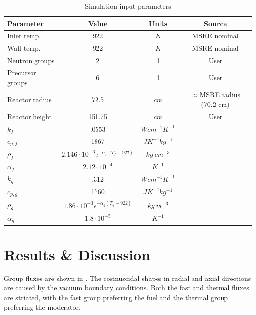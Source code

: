 \documentclass{article}
\let\Oldsection\section
\renewcommand{\section}{\FloatBarrier\Oldsection}
\begin{document}
\begin{table}[htpb]
  \begin{center}
    \begin{tabular}{l|c|c|c}
      Parameter & Value & Units & Source\\\hline\hline
      Inlet temp. & 922 & $K$ & \gls{MSRE} nominal \cite{robertson_msre_1965}\\
      Wall temp. & 922 & $K$ & \gls{MSRE} nominal \cite{robertson_msre_1965}\\
      Neutron groups & 2 & 1 & User\\
      Precursor groups & 6 & 1 & User\\
      Reactor radius & 72.5 & $cm$ & $\approx$\gls{MSRE} radius (70.2 cm) \cite{robertson_msre_1965}\\
      Reactor height & 151.75 & $cm$ & User\\
      $k{_f}$ & .0553 & $W cm^{-1} K^{-1}$ & \cite{robertson_msre_1965}\\
      $c_{p,f}$ & 1967 & $J K^{-1} kg^{-1}$ & \cite{robertson_msre_1965}\\
      $\rho_f$ & $2.146\cdot 10^{-3} e^{-\alpha_f (T_f - 922)}$ & $kg\ cm^{-3}$ & \cite{robertson_msre_1965}\\
      $\alpha_f$ & $2.12\cdot 10^{-4}$ & $K^{-1}$ &
      \cite{haubenreich_experience_1970}\\
      $k_g$ & .312 & $W cm^{-1} K^{-1}$ & \cite{cammi_multi-physics_2011}\\
      $c_{p,g}$ & 1760 & $J K^{-1} kg^{-1}$ & \cite{cammi_multi-physics_2011}\\
      $\rho_g$ & $1.86\cdot 10^{-3} e^{-\alpha_g (T_g - 922)}$ & $kg\ m^{-3}$ &
      \cite{robertson_msre_1965}\\
      $\alpha_g$ & $1.8\cdot 10^{-5}$ & $K^{-1}$ &
      \cite{haubenreich_experience_1970}\\
    \end{tabular}
  \end{center}
  \caption{Simulation input parameters}
  \label{table:params}
\end{table}


\section{Results \& Discussion}

Group fluxes are shown in . The cosinusoidal shapes
in radial and
axial directions are caused by the vacuum boundary conditions. Both the fast and thermal fluxes are striated, with
the fast group preferring the fuel and the thermal group preferring the moderator.
\end{document}
